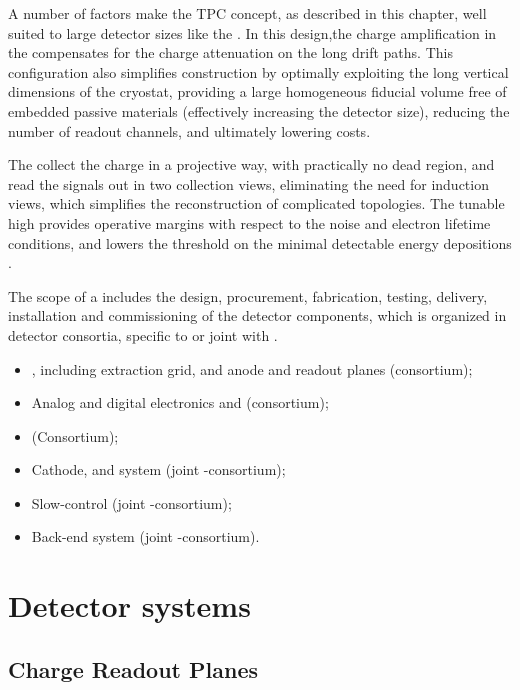 A number of factors make the \dual TPC concept, as described in this chapter, well suited to large detector sizes like the .
In this design,the charge amplification in the  compensates for the charge attenuation on the long drift paths.  This configuration also simplifies
construction by optimally exploiting the long vertical dimensions of the cryostat, providing a large homogeneous fiducial volume  free of embedded passive materials (effectively increasing the detector size), reducing the number of readout channels,  and ultimately lowering costs.  


The  collect the charge in a projective way,  with practically no dead region, and read the signals out  in two collection views, eliminating the need for  induction views, 
which  simplifies the reconstruction of complicated topologies. The tunable high  provides operative margins with respect to the noise and electron lifetime conditions, and lowers the threshold on the minimal  detectable energy depositions .

The scope of a  includes the design, procurement, fabrication, testing, delivery, installation and
commissioning of the detector components, which is organized in detector consortia, specific to \dual or joint with \single. %

\begin{itemize}
\item {}, including extraction grid,  and anode and readout planes (\dual consortium);
\item Analog and digital electronics and  (\dual consortium); 
\item {} (\dual Consortium);
\item Cathode,  and  system (joint \single{}-\dual consortium);  
\item Slow-control (joint \single{}-\dual consortium); 
\item Back-end  system (joint \single{}-\dual consortium).
\end{itemize}


\section{Detector systems}
\label{sec:fddp-ov-systems}
\subsection{Charge Readout Planes}
\label{v4:fddp-ov:crp}

